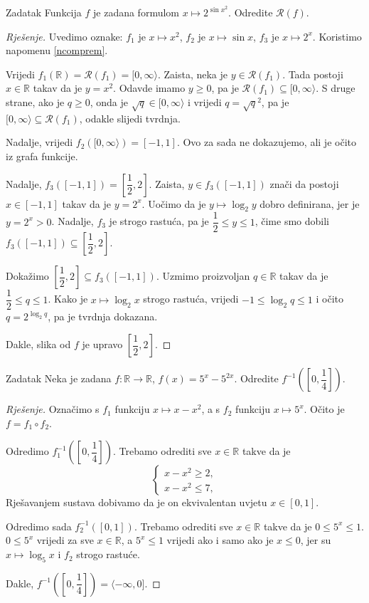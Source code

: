 \begin{exercise}{Zadatak}
\label{excompim1}
Funkcija \(f\) je zadana formulom \(x\mapsto 2^{\sin{x^2}}\). Odredite \(\mathcal{R}(f)\).
\end{exercise}
\begin{proof}[Rješenje]
Uvedimo oznake: \(f_1\) je \(x\mapsto x^2\), \(f_2\) je \(x\mapsto \sin{x}\), \(f_3\) je \(x\mapsto 2^x\). Koristimo napomenu \ref{ncomprem}. 

Vrijedi \(f_1(\mathbb{R})=\mathcal{R}(f_1)=[0, \infty\rangle\). Zaista, neka je \(y\in \mathcal{R}(f_1)\). Tada postoji \(x\in \mathbb{R}\) takav da je \(y=x^2\). Odavde imamo \(y\geq 0\), pa je \(\mathcal{R}(f_1)\subseteq [0, \infty\rangle\). S druge strane, ako je \(q\geq 0\), onda je \(\sqrt{q}\in [0, \infty\rangle\) i vrijedi \(q=\sqrt{q}^2\), pa je \([0, \infty\rangle\subseteq \mathcal{R}(f_1)\), odakle slijedi tvrdnja.

Nadalje, vrijedi \(f_2\left([0, \infty\rangle\right)=[-1, 1]\). Ovo za sada ne dokazujemo, ali je očito iz grafa funkcije. 

Nadalje, \(f_3\left([-1, 1]\right)=\left[\dfrac{1}{2}, 2\right]\). Zaista, \(y\in f_3\left([-1, 1]\right)\) znači da postoji \(x\in [-1, 1]\) takav da je \(y=2^x\). Uočimo da je \(y\mapsto \log_2{y}\) dobro definirana, jer je \(y=2^x>0\). Nadalje, \(f_3\) je strogo rastuća, pa je \(\dfrac{1}{2}\leq y\leq 1\), čime smo dobili \(f_3\left([-1, 1]\right)\subseteq \left[\dfrac{1}{2}, 2\right]\). 

Dokažimo \(\left[\dfrac{1}{2}, 2\right]\subseteq f_3\left([-1, 1]\right)\). Uzmimo proizvoljan \(q\in \mathbb{R}\) takav da je \(\dfrac{1}{2}\leq q\leq 1\). Kako je \(x\mapsto \log_2{x}\) strogo rastuća, vrijedi \(-1\leq \log_2{q}\leq 1\) i očito \(q=2^{\log_2{q}}\), pa je tvrdnja dokazana.

Dakle, slika od \(f\) je upravo \(\left[\dfrac{1}{2}, 2\right]\).
\end{proof}
\begin{exercise}{Zadatak}
Neka je zadana \(f : \mathbb{R}\to \mathbb{R}\), \(f(x)=5^x-5^{2x}\). Odredite \(f^{-1}\left(\left[0, \dfrac{1}{4}\right]\right)\).
\end{exercise}
\begin{proof}[Rješenje]
Označimo s \(f_1\) funkciju \(x\mapsto x-x^2\), a s \(f_2\) funkciju \(x\mapsto 5^x\). Očito je \(f=f_1\circ f_2\).

Odredimo \(f_1^{-1}\left(\left[0, \dfrac{1}{4}\right]\right)\). Trebamo odrediti sve \(x\in \mathbb{R}\) takve da je
\[\begin{cases}
x-x^2\geq 2,\\
x-x^2\leq 7,
\end{cases}\]
Rješavanjem sustava dobivamo da je on ekvivalentan uvjetu \(x\in [0, 1]\).

Odredimo sada \(f_2^{-1}\left([0, 1]\right)\). Trebamo odrediti sve \(x\in \mathbb{R}\) takve da je \(0\leq 5^x\leq 1\). \(0\leq 5^x\) vrijedi za sve \(x\in \mathbb{R}\), a \(5^x\leq 1\) vrijedi ako i samo ako je \(x\leq 0\), jer su \(x\mapsto \log_5{x}\) i \(f_2\) strogo rastuće. 

Dakle, \(f^{-1}\left(\left[0, \dfrac{1}{4}\right]\right)=\langle-\infty, 0]\).
\end{proof}
